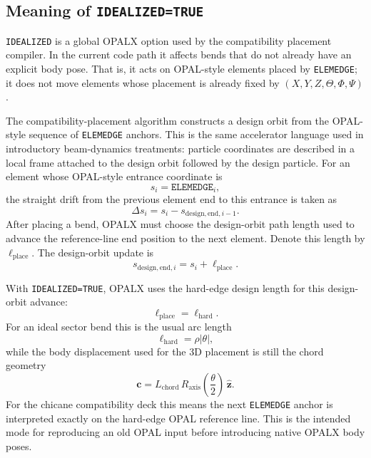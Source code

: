 \documentclass[11pt,a4paper]{article}
\begin{document}
\subsection{Meaning of \texttt{IDEALIZED=TRUE}}

\texttt{IDEALIZED} is a global OPALX option used by the compatibility
placement compiler.  In the current code path it affects bends that do not
already have an explicit body pose.  That is, it acts on OPAL-style elements
placed by \texttt{ELEMEDGE}; it does not move elements whose placement is
already fixed by \((X,Y,Z,\Theta,\Phi,\Psi)\).

The compatibility-placement algorithm constructs a design orbit from the
OPAL-style sequence of \texttt{ELEMEDGE} anchors.  This is the same accelerator
language used in introductory beam-dynamics treatments: particle coordinates
are described in a local frame attached to the design orbit followed by the
design particle.  For an element whose OPAL-style entrance coordinate is
\[
  s_i = \texttt{ELEMEDGE}_i ,
\]
the straight drift from the previous element end to this entrance is taken as
\[
  \Delta s_i = s_i - s_{\mathrm{design,end},i-1}.
\]
After placing a bend, OPALX must choose the design-orbit path length used to
advance the reference-line end position to the next element.  Denote this
length by \(\ell_{\mathrm{place}}\).  The design-orbit update is
\[
  s_{\mathrm{design,end},i} = s_i + \ell_{\mathrm{place}} .
\]

With \texttt{IDEALIZED=TRUE}, OPALX uses the hard-edge design length for this
design-orbit advance:
\[
  \ell_{\mathrm{place}} = \ell_{\mathrm{hard}} .
\]
For an ideal sector bend this is the usual arc length
\[
  \ell_{\mathrm{hard}} = \rho |\theta|,
\]
while the body displacement used for the 3D placement is still the chord
geometry
\[
  \mathbf c
    =
    L_{\mathrm{chord}}\,
    R_{\mathrm{axis}}\!\left(\frac{\theta}{2}\right)\,\hat{\mathbf z}.
\]
For the chicane compatibility deck this means the next \texttt{ELEMEDGE}
anchor is interpreted exactly on the hard-edge OPAL reference line.  This is
the intended mode for reproducing an old OPAL input before introducing native
OPALX body poses.
\end{document}
